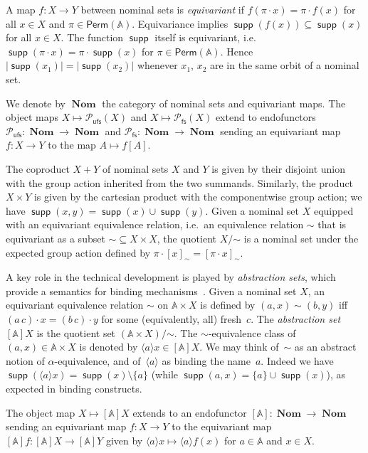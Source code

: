 \documentclass[10pt,a4paper]{amsart}
\renewcommand{\o}{\cdot}
\numberwithin{equation}{section}
\newcommand{\seq}{\subseteq}
\newcommand{\Perm}{\mathsf{Perm}}
\newcommand{\pow}{\mathcal{P}}
\newcommand{\braket}[1]{\langle #1 \rangle}
\newcommand{\fs}{\mathsf{fs}}
\newcommand{\+}[1]{\mathcal{#1}\xspace}
\newcommand{\Pow}{\mathcal{P}}
\newcommand{\ufs}{{\mathsf{ufs}}}
\DeclareMathOperator{\Nom}{\mathbf{Nom}}
\newcommand{\names}{\mathbb{A}}
\DeclareMathOperator{\supp}{\mathsf{supp}} %
\newcommand{\powfs}{\pow_{\fs}}
\theoremstyle{definition}
\begin{document}
A map $f\colon X\to Y$ between nominal sets is \emph{equivariant} if $f(\pi\o x)=\pi\o f(x)$ for all $x\in X$ and $\pi\in \Perm(\names)$. Equivariance implies $\supp(f(x))\seq \supp(x)$ for all $x\in X$. The function $\supp$ itself is
equivariant, i.e.~$\supp(\pi\cdot x)=\pi\cdot \supp(x)$ for
$\pi\in \Perm(\names)$.  Hence $|\supp(x_1)| = |\supp(x_2)|$ whenever $x_1$, $x_2$
are in the same orbit of a nominal set. 

We denote by $\Nom$ the category of nominal sets and equivariant maps. The object maps $X\mapsto \Pow_\ufs(X)$ and $X\mapsto \powfs(X)$ extend to endofunctors $\Pow_\ufs\colon \Nom\to \Nom$ and $\powfs\colon \Nom\to \Nom$
sending an equivariant map $f\colon X\to Y$ to the map $A\mapsto f[A]$. 

The coproduct $X+Y$ of nominal sets $X$ and $Y$ is given by their disjoint union with the group action inherited from the two summands. Similarly, the product $X \times Y$ is given by the cartesian product with the componentwise group action; we have $\supp(x,y)
= \supp(x) \cup \supp(y)$. Given a nominal set $X$ equipped with an
equivariant equivalence relation, i.e.~an equivalence relation $\sim$ that is equivariant as a 
subset $\mathord{\sim} \subseteq X \times X$, the quotient
$X/\mathord{\sim}$ is a nominal set under the expected group action
defined by $\pi \cdot [x]_\sim = [\pi \cdot x]_\sim$.

A key role in the technical development is played by
\emph{abstraction sets}, which provide a semantics for binding
mechanisms~\cite{GabbayPitts99}. Given a nominal set $X$, an equivariant equivalence relation $\sim$ on
  $\names \times X$ is defined by $(a,x)\sim (b,y)$ iff
  $(a\, c)\cdot x=(b\, c)\cdot y$ for some (equivalently, all)
  fresh~$c$. The \emph{abstraction set} $[\names]X$ is the quotient
  set $(\names\times X)/\mathord{\sim}$. The $\sim$-equivalence class
  of $(a,x)\in\names\times X$ is denoted by
  $\braket{a} x\in [\names]X$. We may think of~$\sim$ as an abstract notion of $\alpha$-equivalence,
and of~$\braket{a}$ as binding the name~$a$. Indeed we have
$\supp(\braket{a} x)= \supp(x)\setminus\{a\}$ (while
$\supp(a,x)=\{a\}\cup\supp(x)$), as expected in binding constructs.

 The object map $X\mapsto [\names]X$ extends to an endofunctor
$[\names]\colon \Nom \to \Nom$
sending an equivariant map $f\colon X\to Y$ to the equivariant map $[\names]f\colon [\names]X\to [\names]Y$ given by $\braket{a}x\mapsto \braket{a}f(x)$ for $a\in \names$ and $x\in X$.
\end{document}
